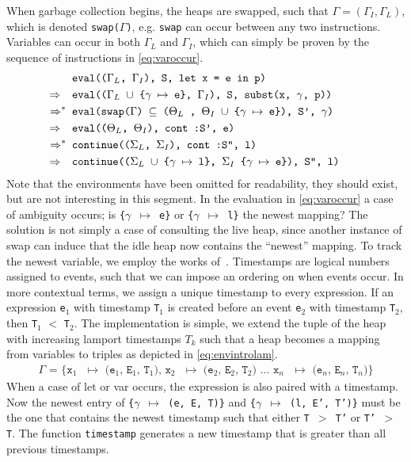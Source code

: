 When garbage collection begins, the heaps are swapped, such that $\Gamma = (\Gamma_I, \Gamma_L)$, which is denoted \texttt{swap($\Gamma$)}, e.g. \texttt{swap} can occur between any two instructions.
Variables can occur in both $\Gamma_L$ and $\Gamma_I$, which can simply be proven by the sequence of instructions in \autoref{eq:varoccur}.
\begin{align}
  &\texttt{ eval(($\Gamma_L$, $\Gamma_I$), S, let x = e in p)} \label{eq:varoccur}\\
  \Rightarrow\hspace*{0.18cm} &\texttt{ eval(($\Gamma_L$ $\cup$ \{$\gamma$ $\mapsto$ e\}, $\Gamma_I$), S, subst(x, $\gamma$, p))}\tag*{}\\
  \Rightarrow^* &\texttt{ eval(swap($\Gamma$) $\subseteq$ ($\Theta_L$ , $\Theta_I$ $\cup$ \{$\gamma$ $\mapsto$ e\}), S', $\gamma$)}\tag*{}\\
  \Rightarrow\hspace*{0.18cm} &\texttt{ eval(($\Theta_L$, $\Theta_I$), cont :S', e)}\tag*{}\\
  \Rightarrow^* &\texttt{ continue(($\Sigma_L$, $\Sigma_I$), cont :S'', l)}\tag*{}\\
  \Rightarrow\hspace*{0.18cm} &\texttt{ continue(($\Sigma_L$ $\cup$ \{$\gamma$ $\mapsto$ l\}, $\Sigma_I$ \{$\gamma$ $\mapsto$ e\}), S'', l)}\tag*{}
\end{align}
Note that the environments have been omitted for readability, they should exist, but are not interesting in this segment.
In the evaluation in \autoref{eq:varoccur} a case of ambiguity occurs; is \texttt{\{$\gamma$ $\mapsto$ e\}} or \texttt{\{$\gamma$ $\mapsto$ l\}} the newest mapping?
The solution is not simply a case of consulting the live heap, since another instance of swap can induce that the idle heap now contains the ``newest'' mapping.
To track the newest variable, we employ the works of~\cite{lamport}.
Timestamps are logical numbers assigned to events, such that we can impose an ordering on when events occur.
In more contextual terms, we assign a unique timestamp to every expression.
If an expression \texttt{e}$_1$ with timestamp \texttt{T}$_1$ is created before an event \texttt{e}$_2$ with timestamp \texttt{T}$_2$, then \texttt{T}$_1$ $<$ \texttt{T}$_2$. 
The implementation is simple, we extend the tuple of the heap with increasing lamport timestamps $T_k$ such that a heap becomes a mapping from variables to triples as depicted in \autoref{eq:envintrolam}.
\begin{align}
  \texttt{$\Gamma$ = \{x$_1$ $\mapsto$ (e$_1$, E$_1$, T$_1$), x$_2$ $\mapsto$ (e$_2$, E$_2$, T$_2$) $\dots$ x$_n$ $\mapsto$ (e$_n$, E$_n$, T$_n$)\}}\label{eq:envintrolam}
\end{align}
When a case of let or var occurs, the expression is also paired with a timestamp.
Now the newest entry of \texttt{\{$\gamma$ $\mapsto$ (e, E, T)\}} and \texttt{\{$\gamma$ $\mapsto$ (l, E', T')\}} must be the one that contains the newest timestamp such that either \texttt{T $>$ T'} or \texttt{T' $>$ T}.
The function \texttt{timestamp} generates a new timestamp that is greater than all previous timestamps.

